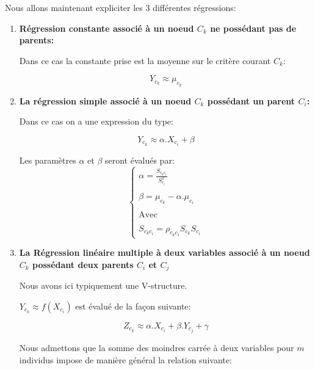 \documentclass[a4paper]{article}
\begin{document}
Nous allons maintenant expliciter les 3 différentes régressions:

\begin{enumerate}
\item  \textbf{Régression constante associé à un noeud $C_{k}$ ne possédant pas de parents:}

Dans ce cas la constante prise est la moyenne sur le critère courant $C_{k}$:

$$Y_{c_{k}}\approx \mu_{c_{k}}$$

\item \textbf{La régression simple associé à un noeud $C_{k}$ possédant un parent $C_{i}$:}

Dans ce cas on a une expression du type:

$$Y_{c_{k}}\approx \alpha.X_{c_{i}}+\beta$$

Les paramètres $\alpha$ et $\beta$ seront évalués par: 
\[
\left\lbrace 
\begin{array}{lcl}
\alpha=\frac{S_{c_{k}c_{i}}}{S_{c_{i}}^2}\\ \\

\beta=\mu_{c_{k}}-\alpha.\mu_{c_{i}}\\ \\
\text{Avec   } \\ \\
S_{c_{k}c_{i}}=\rho_{c_{k}c_{i}}S_{c_{k}}S_{c_{i}}
\end{array}\right.
\]
\newpage
\item \textbf{La Régression linéaire multiple à deux variables associé à un noeud $C_{k}$ possédant deux parents $C_{i}$ et $C_{j}$}


Nous avons ici typiquement une V-structure.

 $Y_{c_{k}}\approx f(X_{c_{i}})$ est évalué de la façon suivante:

$$Z_{c_{k}}\approx \alpha.X_{c_{i}}+\beta.Y_{c_{j}}+\gamma$$


Nous admettons que la somme des moindres carrée à deux variables pour $m$ individus impose de manière général la relation suivante:


\end{enumerate}
\end{document}
